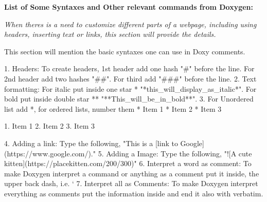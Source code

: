 \label{md_code_syntaxes_Page3}%
%
 {\bfseries{List of Some Syntaxes and Other relevant commands from Doxygen\+:}}

 {\itshape When theres is a need to customize different parts of a webpage, including using headers, inserting text or links, this section will provide the details.}



This section will mention the basic syntaxes one can use in Doxy comments. \begin{DoxyVerb}1. Headers: To create headers, 1st header add one hash "#" before the line. For 2nd header add two hashes "##". For third add "###" before the line.
2. Text formatting: For italic put inside one star * "*this_will_display_as_italic*". For bold put inside double star ** "**This_will_be_in_bold**".
3. For Unordered list add *, for ordered lists, number them 
* Item 1
* Item 2
* Item 3

1. Item 1
2. Item 2
3. Item 3

4. Adding a link: Type the following,
"This is a [link to Google](https://www.google.com/)."
5. Adding a Image: Type the following,
"![A cute kitten](https://placekitten.com/200/300)"
6. Interpret a word as comment: To make Doxygen interpret a command or anything as a comment put it inside, the upper back dash, i.e. `
7. Interpret all as Comments: To make Doxygen interpret everything as comments put the information inside \verbatim and end it also with verbatim.
\end{DoxyVerb}
 